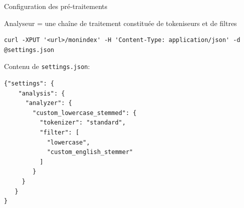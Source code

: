 \begin{frame}[fragile]{Configuration des pré-traitements}

Analyseur = une chaîne de traitement constituée de tokeniseurs et de filtres

\begin{verbatim}
curl -XPUT '<url>/monindex' -H 'Content-Type: application/json' -d @settings.json
\end{verbatim}
\vfill

Contenu de \texttt{settings.json}:

\begin{verbatim}
{"settings": {
    "analysis": {
      "analyzer": {
        "custom_lowercase_stemmed": {
          "tokenizer": "standard",
          "filter": [
            "lowercase",
            "custom_english_stemmer"
          ]
        } 
     } 
   } 
}
\end{verbatim}

\end{frame}

